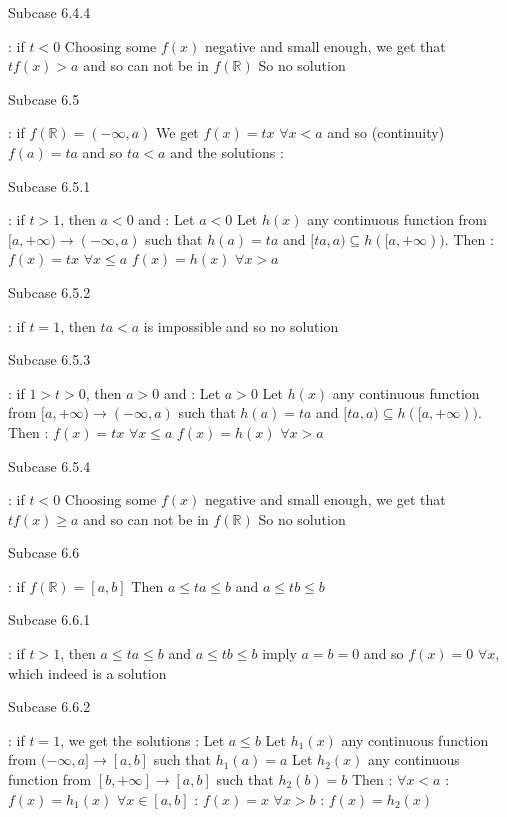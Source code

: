 \begin{solution}
\begin{tcolorbox}
\begin{bolded}Subcase 6.4.4\end{bolded} : if $t<0$
Choosing some $f(x)$ negative and small enough, we get that $tf(x)> a$ and so can not be in $f(\mathbb R)$
So no solution

\begin{bolded}Subcase 6.5\end{bolded} : if $f(\mathbb R)=(-\infty,a)$
We get $f(x)=tx$ $\forall x<a$ and so (continuity) $f(a)=ta$ and so $ta<a$ and the solutions :

\begin{bolded}Subcase 6.5.1\end{bolded}: if $t>1$, then $a< 0$ and :
Let $a<0$ 
Let $h(x)$ any continuous function from $[a,+\infty)\to(-\infty,a)$ such that $h(a)=ta$ and $[ta,a)\subseteq h([a,+\infty))$. Then :
$f(x)=tx$ $\forall x\le a$
$f(x)=h(x)$ $\forall x>a$

\begin{bolded}Subcase 6.5.2\end{bolded}: if $t=1$, then $ta<a$ is impossible and so no solution

\begin{bolded}Subcase 6.5.3\end{bolded} : if $1>t>0$, then $a>0$ and :
Let $a>0$ 
Let $h(x)$ any continuous function from $[a,+\infty)\to(-\infty,a)$ such that $h(a)=ta$ and $[ta,a)\subseteq h([a,+\infty))$. Then :
$f(x)=tx$ $\forall x\le a$
$f(x)=h(x)$ $\forall x>a$

\begin{bolded}Subcase 6.5.4\end{bolded} : if $t<0$
Choosing some $f(x)$ negative and small enough, we get that $tf(x)\ge a$ and so can not be in $f(\mathbb R)$
So no solution

\begin{bolded}Subcase 6.6 \end{bolded}: if $f(\mathbb R)=[a,b]$
Then $a\le ta\le b$ and $a\le tb\le b$

\begin{bolded}Subcase 6.6.1\end{bolded} : if $t>1$, then $a\le ta\le b$ and $a\le tb\le b$ imply $a=b=0$ and so $f(x)=0$ $\forall x$, which indeed is a solution

\begin{bolded}Subcase 6.6.2\end{bolded} : if $t=1$, we get the solutions :
Let $a\le b$
Let $h_1(x)$ any continuous function from $(-\infty,a]\to[a,b]$ such that $h_1(a)=a$
Let $h_2(x)$ any continuous function from $[b,+\infty]\to[a,b]$ such that $h_2(b)=b$
Then :
$\forall x<a$ : $f(x)=h_1(x)$
$\forall x\in[a,b]$ : $f(x)=x$
$\forall x>b$ : $f(x)=h_2(x)$


\end{tcolorbox}
\end{solution}
